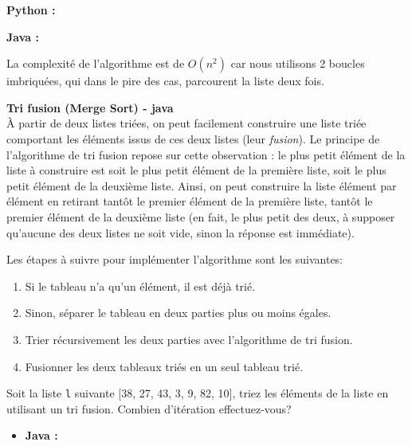 \begin{Exercice} [20 minutes]
    \begin{solution}
        \textbf{Python :}
             
        \textbf{Java :}
            
    
    La complexité de l'algorithme est de $O(n^2)$ car nous utilisons 2 boucles imbriquées, qui dans le pire des cas, parcourent la liste deux fois.
    \end{solution}
    
\end{Exercice}


\begin{Exercice} [20 minutes] \textbf{Tri fusion (Merge Sort) - java} \\
    À partir de deux listes triées, on peut facilement construire une liste triée comportant les éléments issus de ces deux listes (leur \textit{fusion}). Le principe de l'algorithme de tri fusion repose sur cette observation : le plus petit élément de la liste à construire est soit le plus petit élément de la première liste, soit le plus petit élément de la deuxième liste. Ainsi, on peut construire la liste élément par élément en retirant tantôt le premier élément de la première liste, tantôt le premier élément de la deuxième liste (en fait, le plus petit des deux, à supposer qu'aucune des deux listes ne soit vide, sinon la réponse est immédiate). 
    
    Les étapes à suivre pour implémenter l'algorithme sont les suivantes:
    \begin{enumerate}
        \item Si le tableau n'a qu'un élément, il est déjà trié.
        \item Sinon, séparer le tableau en deux parties plus ou moins égales.
        \item Trier récursivement les deux parties avec l'algorithme de tri fusion.
        \item Fusionner les deux tableaux triés en un seul tableau trié.
    \end{enumerate}
    
    Soit la liste \lstinline{l} suivante [38, 27, 43, 3, 9, 82, 10], triez les éléments de la liste en utilisant un tri fusion. Combien d'itération effectuez-vous?
    
    \begin{itemize}
        \item \textbf{Java :}
            
    \end{itemize}
    

\end{Exercice}
